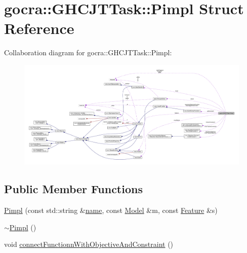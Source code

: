 \hypertarget{structgocra_1_1GHCJTTask_1_1Pimpl}{}\section{gocra\+:\+:G\+H\+C\+J\+T\+Task\+:\+:Pimpl Struct Reference}
\label{structgocra_1_1GHCJTTask_1_1Pimpl}


Collaboration diagram for gocra\+:\+:G\+H\+C\+J\+T\+Task\+:\+:Pimpl\+:\nopagebreak
\begin{figure}[H]
\begin{center}
\leavevmode
\includegraphics[width=350pt]{d8/daf/structgocra_1_1GHCJTTask_1_1Pimpl__coll__graph}
\end{center}
\end{figure}
\subsection*{Public Member Functions}
\begin{DoxyCompactItemize}
\item 
\hyperlink{structgocra_1_1GHCJTTask_1_1Pimpl_ad413aad5c0e13b459b10d16dc91c8579}{Pimpl} (const std\+::string \&\hyperlink{structgocra_1_1GHCJTTask_1_1Pimpl_a62bf1c09164be6cf8a48360bd6e53d64}{name}, const \hyperlink{classocra_1_1Model}{Model} \&m, const \hyperlink{classocra_1_1Feature}{Feature} \&s)
\item 
\hyperlink{structgocra_1_1GHCJTTask_1_1Pimpl_a40a8c393004df9cb06d2cacf7a60b55f}{$\sim$\+Pimpl} ()
\item 
void \hyperlink{structgocra_1_1GHCJTTask_1_1Pimpl_aeedb4e2ac7e5dc4b68655b124ee8ed58}{connect\+Functionn\+With\+Objective\+And\+Constraint} ()
\end{DoxyCompactItemize}
